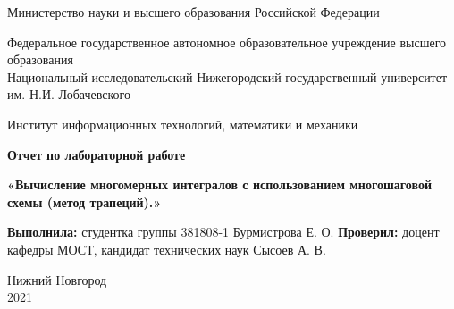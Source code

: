 \documentclass{report}
\begin{document}
	
	\begin{titlepage}
		
		\begin{center}
			Министерство науки и высшего образования Российской Федерации
		\end{center}
		
		\begin{center}
			Федеральное государственное автономное образовательное учреждение высшего образования \\
			Национальный исследовательский Нижегородский государственный университет им. Н.И. Лобачевского
		\end{center}
		
		\begin{center}
			Институт информационных технологий, математики и механики
		\end{center}
		
		\vspace{4em}
		
		\begin{center}
			\textbf{\Large Отчет по лабораторной работе} \\
		\end{center}
		\begin{center}
			\textbf{\Large«Вычисление многомерных интегралов с использованием многошаговой схемы (метод трапеций).»} \\
		\end{center}
		
		\vspace{4em}
		
		\newbox{\lbox}
		\newlength{\maxl}
		\setlength{\maxl}{\wd\lbox}
		\hfill\parbox{7cm}{
			\hspace*{5cm}\hspace*{-5cm}\textbf{Выполнила:} 
			\newline студентка группы 381808-1 
			\newline Бурмистрова Е. О.
			\newline
			\newline
			\hspace*{5cm}\hspace*{-5cm}\textbf{Проверил:}
			\newline доцент кафедры МОСТ, 
			\newline кандидат технических наук 
			\newline Сысоев А. В.
		}
		\vspace{\fill}
		
		\begin{center} Нижний Новгород \\ 2021 \end{center}
		
	\end{titlepage}
		\setcounter{page}{2}
	
\end{document}
